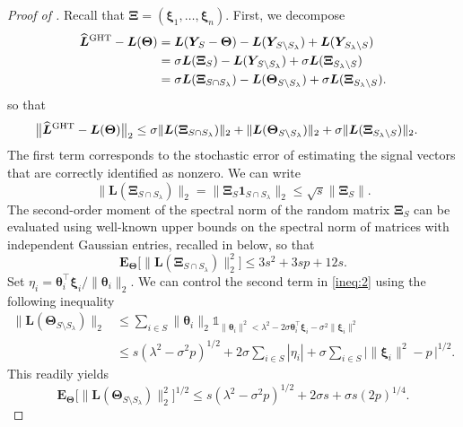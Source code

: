 \documentclass[sts,preprint,reqno,a4paper]{imsart}
\def\l{\lambda}
\def\bxi{\boldsymbol\xi}
\def\bXi{\boldsymbol\Xi}
\def\bt{\boldsymbol\theta}
\def\btheta{\boldsymbol\theta}
\def\bTheta{\boldsymbol\Theta}
\def\bY{\boldsymbol Y\!}
\def\bL{\boldsymbol L}
\def\bfT{\mathbf\Theta}
\def\fcar{\mathds{1}}
\def\esp{\mathbf E}
\def\hat{\widehat}
\theoremstyle{plain}
\theoremstyle{remark}
\theoremstyle{definition}
\begin{document}
\begin{proof}[Proof of ]
	Recall that $\bXi =(\bxi_1, \ldots,\bxi_n)$. First, we decompose
	\begin{align}
		\hat{\bL}{}^{\rm GHT}-\bL(\bfT)
		&= \bL(\bY_S-\bTheta) - \bL(\bY_{S\setminus S_\lambda} )+ \bL(\bY_{S_\l\setminus S})\\
		&= \sigma\bL(\bXi_S) - \bL(\bY_{S\setminus S_\lambda} )+ \sigma\bL(\bXi_{S_\l\setminus S})\\
		&= \sigma\bL(\bXi_{S\cap S_\lambda}) - \bL(\bTheta_{S\setminus S_\lambda} )+ \sigma\bL(\bXi_{S_\l\setminus S}).
		\label{decomposition}
	\end{align}
	so that
	\begin{align}\label{ineq:2}
	\big\| \hat{\bL}{}^{\rm GHT}-\bL(\bfT) \big\|_2 &\le \sigma\|\bL(\bXi_{S\cap S_\lambda})\|_2 +
	\|\bL(\bTheta_{S\setminus S_\lambda})\|_2 + \sigma\|\bL(\bXi_{S_\l \setminus S})\|_2.
	\end{align}
	The first term corresponds to the stochastic error of estimating the signal vectors   
	that are correctly identified as nonzero. We can write
	\begin{equation}
	\|\bL(\bXi_{S\cap S_\lambda})\|_2 = \|\bXi_{S}\mathbf 1_{S\cap S_\lambda}\|_2\le
 	\sqrt{s}\|\bXi_{S}\|.
	\end{equation}
	The second-order moment of the spectral norm of the random matrix $\bXi_S$ can be
	evaluated using well-known upper bounds on the spectral norm of matrices with
	independent Gaussian entries, recalled in  below, so that
	\begin{equation}\label{esperance_norm}
	\esp_\bfT \big[\|\bL(\bXi_{S\cap S_\lambda})\|_2^2\big] \le 3s^2 + 3sp+12s.
	\end{equation}
 	Set $\eta_i=\btheta_i^\top\bxi_i/\|\btheta_i\|_2$. We can control the second term in \eqref{ineq:2} using the following inequality
    \begin{align}
	\|\bL(\bTheta_{S\setminus S_\lambda})\|_2&\le \sum_{i\in S} \|\bt_i\|_2 \fcar_{\|\bt_i\|^2<\lambda^2	-2\sigma\bt_i^\top \bxi_i-\sigma^2\|\bxi_i\|^2} \\
	&\le s(\lambda^2-\sigma^2p)^{1/2}+2\sigma\sum_{i\in S} |\eta_i| + \sigma\sum_{i\in S} \big| \|\bxi_i\|^2-p\, \big|^{1/2}.
	\end{align}
	This readily yields
	\begin{equation}\label{eval_on_support}
	\esp_\bfT \big[\|\bL(\bTheta_{S\setminus S_\lambda})\|_2^2]^{1/2}
	\le s(\lambda^2-\sigma^2p)^{1/2}+2\sigma s + \sigma s (2p)^{1/4}.

\end{equation}
\end{proof}
\end{document}
